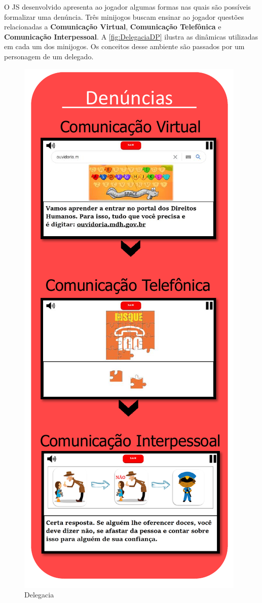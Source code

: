 O \ac{JS} desenvolvido apresenta ao jogador algumas formas nas quais são possíveis formalizar uma denúncia. Três minijogos buscam ensinar ao jogador questões relacionadas a \textbf{Comunicação Virtual}, \textbf{Comunicação Telefônica} e \textbf{Comunicação Interpessoal}. A \autoref{fig:DelegaciaDP} ilustra as dinâmicas utilizadas em cada um dos minijogos. Os conceitos desse ambiente são passados por um personagem de um delegado. 

\begin{figure}%
  \vspace{-20pt}
  \caption{\label{fig:DelegaciaDP}Delegacia}
  \includegraphics[width=\linewidth]{./Visuais/Delegacia.pdf}

\end{figure}
